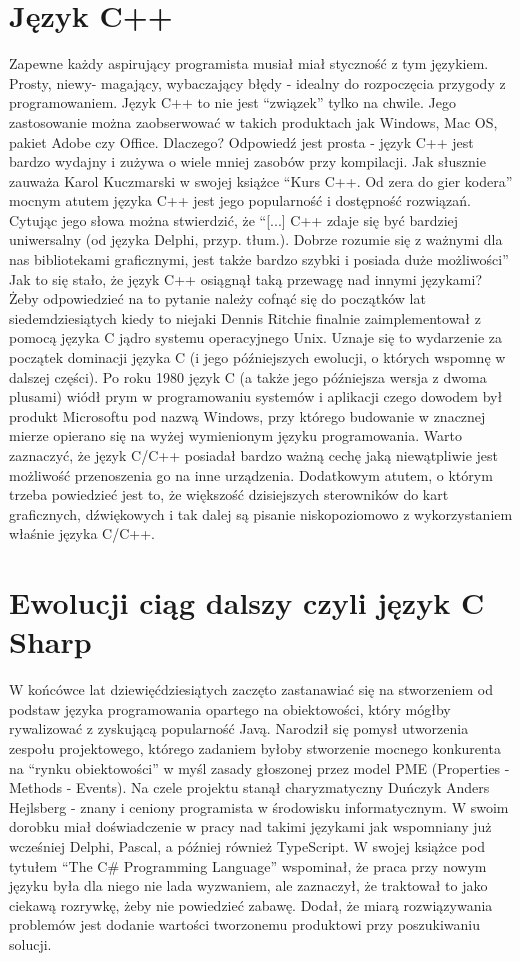 \documentclass{article}
\begin{document}
\section*{\textbf{Język C++}}
Zapewne każdy aspirujący programista musiał miał styczność z tym językiem. Prosty, niewy- magający, wybaczający błędy - idealny do rozpoczęcia przygody z programowaniem. Język C++ to nie jest “związek” tylko na chwile. Jego zastosowanie można zaobserwować w takich produktach jak Windows, Mac OS, pakiet Adobe czy Office. Dlaczego? Odpowiedź jest prosta - język C++ jest bardzo wydajny i zużywa o wiele mniej zasobów przy kompilacji. Jak słusznie zauważa Karol Kuczmarski w swojej książce “Kurs C++. Od zera do gier kodera” \cite{ref5} mocnym atutem języka C++ jest jego popularność i dostępność rozwiązań. Cytując jego słowa można stwierdzić, że “[...] C++ zdaje się być bardziej uniwersalny (od języka Delphi, przyp. tłum.). Dobrze rozumie się z ważnymi dla nas bibliotekami graficznymi, jest także bardzo szybki i posiada duże możliwości” Jak to się stało, że język C++ osiągnął taką przewagę nad innymi językami? Żeby odpowiedzieć na to pytanie należy cofnąć się do początków lat siedemdziesiątych kiedy to niejaki Dennis Ritchie finalnie zaimplementował z pomocą języka C jądro systemu operacyjnego Unix. Uznaje się to wydarzenie za początek dominacji języka C (i jego późniejszych ewolucji, o których 
wspomnę w dalszej części). Po roku 1980 język C (a także jego późniejsza wersja z dwoma plusami) wiódł prym w programowaniu systemów i aplikacji czego dowodem był produkt Microsoftu pod nazwą Windows, przy którego budowanie w znacznej mierze opierano się na wyżej wymienionym języku programowania. Warto zaznaczyć, że język C/C++ posiadał bardzo ważną cechę jaką niewątpliwie jest możliwość przenoszenia go na inne urządzenia. Dodatkowym atutem, o którym trzeba powiedzieć jest to, że większość dzisiejszych sterowników do kart graficznych, dźwiękowych i tak dalej są pisanie niskopoziomowo z wykorzystaniem właśnie języka C/C++.
\section*{\textbf{Ewolucji ciąg dalszy czyli język C Sharp}}
W końcówce lat dziewięćdziesiątych zaczęto zastanawiać się na stworzeniem od podstaw języka programowania opartego na obiektowości, który mógłby rywalizować z zyskującą popularność Javą. Narodził się pomysł utworzenia zespołu projektowego, którego zadaniem byłoby stworzenie mocnego konkurenta na “rynku obiektowości” w myśl zasady głoszonej przez model PME (Properties - Methods - Events). Na czele projektu stanął charyzmatyczny Duńczyk Anders Hejlsberg - znany i ceniony programista w środowisku informatycznym. W swoim dorobku miał doświadczenie w pracy nad takimi językami jak wspomniany już wcześniej Delphi, Pascal, a później również TypeScript. W swojej książce pod tytułem “The C\# Programming Language” \cite{ref6} wspominał, że praca przy nowym języku była dla niego nie lada wyzwaniem, ale zaznaczył, że traktował to jako ciekawą rozrywkę, żeby nie powiedzieć zabawę. Dodał, że miarą rozwiązywania problemów jest dodanie wartości tworzonemu produktowi przy poszukiwaniu solucji.
\end{document}
